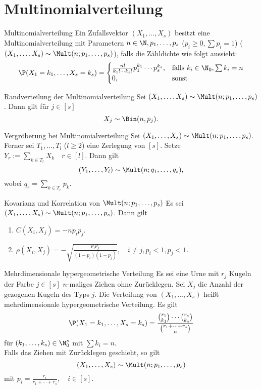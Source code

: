 \section*{Multinomialverteilung}

\begin{karte}{Multinomialverteilung}
    Ein Zufallsvektor \( (X_1, \ldots, X_s) \) besitzt eine 
    Multinomialverteilung mit Parametern \( n\in\N, p_1,\ldots,p_s \) 
    (\(p_i \geq 0, \sum p_i = 1\)) 
    (\( (X_1,\ldots,X_s) \sim \Mult(n;p_1,\ldots,p_s) \)), falls die Zähldichte wie folgt aussieht: 
    \[ \P(X_1 = k_1, \ldots, X_s = k_s) = \begin{cases}
        \frac{ n! }{ k_1! \cdots k_s! } p_1^{k_1} \cdots p_s^{k_s}, & \text{falls } k_i \in \N_0, \sum k_i = n\\
        0, & \text{sonst}
    \end{cases} \]
\end{karte}

\begin{karte}{Randverteilung der Multinomialverteilung}
    Sei \( (X_1, \ldots, X_s) \sim \Mult(n;p_1,\ldots,p_s) \). 
    Dann gilt für \( j\in [s] \)
    \[ X_j \sim \Bin(n,p_j). \]
\end{karte}

\begin{karte}{Vergröberung bei Multinomialverteilung}
    Sei \( (X_1,\ldots,X_s) \sim \Mult(n;p_1,\ldots,p_s) \). 
    Ferner sei \( T_1,\ldots,T_l \) (\(l \geq 2\)) eine Zerlegung von \( [s] \).
    Setze \( Y_r := \sum_{k\in T_r} X_k \quad r\in [l] \).
    Dann gilt 
    \[ (Y_1,\ldots,Y_l) \sim \Mult(n;q_1,\ldots,q_s), \] 
    wobei \( q_r = \sum_{k\in T_r} p_k \).
\end{karte}

\begin{karte}{Kovarianz und Korrelation von \( \Mult(n;p_1,\ldots,p_s) \)}
    Es sei \( (X_1,\ldots,X_s) \sim \Mult(n;p_1,\ldots,p_s) \). Dann gilt 
    \begin{enumerate}
        \item \( C(X_i, X_j) = -n p_i p_j \).
        \item \( \rho(X_i, X_j) = -\sqrt{\frac{p_i p_j}{(1 - p_i)(1 - p_j)}}, \quad i \neq j, p_i<1, p_j < 1\).
    \end{enumerate}
\end{karte}

\begin{karte}{Mehrdimensionale hypergeometrische Verteilung}
    Es sei eine Urne mit \( r_j \) Kugeln der Farbe \( j \in [s] \) 
    \( n \)-maliges Ziehen ohne Zurücklegen. 
    Sei \(X_j \) die Anzahl der gezogenen Kugeln des Typs \(j\). 
    Die Verteilung von \( (X_1,\ldots,X_s) \) heißt mehrdimensionale hypergeometrische Verteilung.
    Es gilt 
    \[ \P(X_1 = k_1, \ldots, X_s = k_s) = \frac{\binom{r_1}{k_1} \cdots \binom{r_s}{k_s}}{\binom{r_1 + \cdots + r_s}{n}} \]
    für \( (k_1,\ldots, k_s) \in \N_0^s \) mit \( \sum k_i = n \).\\
    Falls das Ziehen mit Zurücklegen geschieht, so gilt 
    \[ (X_1,\ldots, X_s) \sim \Mult(n;p_1,\ldots,p_s) \] 
    mit \( p_i = \frac{r_i}{r_1 + \cdots + r_s}, \quad i \in [s] \).
\end{karte}